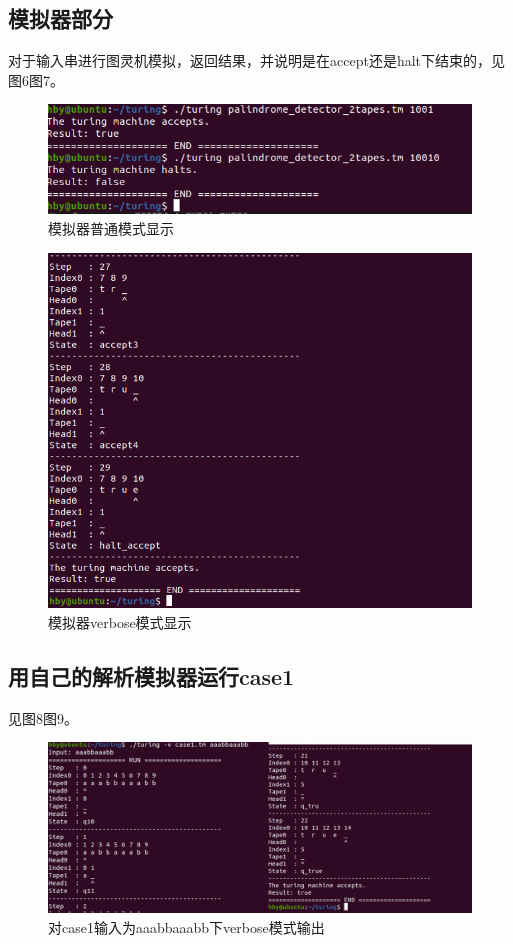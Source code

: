\documentclass[UTF8]{article}
\begin{document}
\subsection{模拟器部分}
对于输入串进行图灵机模拟，返回结果，并说明是在accept还是halt下结束的，见图6图7。

\begin{figure}[h]
  \centering
  \includegraphics[scale=0.8]{pic7.png}
  \caption{模拟器普通模式显示}
\end{figure}

\begin{figure}[h]
  \centering
  \includegraphics[scale=0.6]{pic8.png}
  \caption{模拟器verbose模式显示}
\end{figure}

\subsection{用自己的解析模拟器运行case1}
见图8图9。
\begin{figure}[h]
  \centering
  \includegraphics[scale=0.6]{pic9.png}
  \caption{对case1输入为aaabbaaabb下verbose模式输出}
\end{figure}
\end{document}

